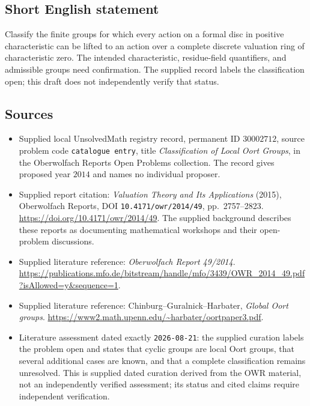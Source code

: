 \documentclass[11pt]{article}
\begin{document}
\subsection{Short English statement}
Classify the finite groups for which every action on a formal disc in positive characteristic can be lifted to an action over a complete discrete valuation ring of characteristic zero. The intended characteristic, residue-field quantifiers, and admissible groups need confirmation. The supplied record labels the classification open; this draft does not independently verify that status.
\subsection{Sources}
\begin{itemize}
\item Supplied local UnsolvedMath registry record, permanent ID \(30002712\), source problem code \texttt{catalogue entry}, title \emph{Classification of Local Oort Groups}, in the Oberwolfach Reports Open Problems collection. The record gives proposed year \(2014\) and names no individual proposer.
\item Supplied report citation: \emph{Valuation Theory and Its Applications} (2015), Oberwolfach Reports, DOI \texttt{10.4171/owr/2014/49}, pp.\ 2757--2823. \url{https://doi.org/10.4171/owr/2014/49}. The supplied background describes these reports as documenting mathematical workshops and their open-problem discussions.
\item Supplied literature reference: \emph{Oberwolfach Report 49/2014}. \url{https://publications.mfo.de/bitstream/handle/mfo/3439/OWR_2014_49.pdf?isAllowed=y&sequence=1}.
\item Supplied literature reference: Chinburg--Guralnick--Harbater, \emph{Global Oort groups}. \url{https://www2.math.upenn.edu/~harbater/oortpaper3.pdf}.
\item Literature assessment dated exactly \texttt{2026-08-21}: the supplied curation labels the problem open and states that cyclic groups are local Oort groups, that several additional cases are known, and that a complete classification remains unresolved. This is supplied dated curation derived from the OWR material, not an independently verified assessment; its status and cited claims require independent verification.
\end{itemize}
\end{document}
